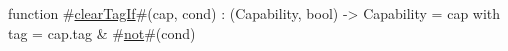 function #\hyperref[sailRISCVzclearTagIf]{clearTagIf}#(cap, cond) : (Capability, bool) -> Capability =
    {cap with tag = cap.tag & #\hyperref[sailRISCVznot]{not}#(cond)}
